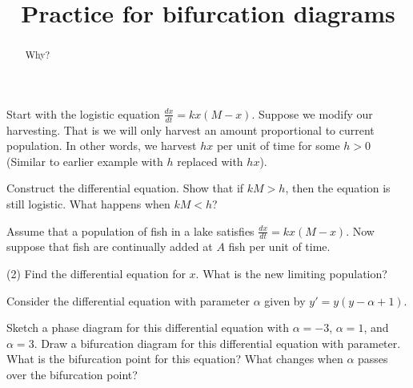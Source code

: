 \documentclass{ximera}
\title{Practice for bifurcation diagrams}
\begin{document}
\begin{abstract}
    Why?
\end{abstract}
\maketitle

\begin{exercise}
    Start with the logistic equation $\frac{dx}{dt} = kx(M-x)$. Suppose we modify our harvesting. That is we will only harvest  an amount proportional to current population. In other words, we harvest $hx$ per unit of time for some $h > 0$ (Similar to earlier example with $h$ replaced with $hx$).
    \begin{tasks}
        \task Construct the differential equation. 
        \task Show that if $kM > h$, then the equation is still logistic.
        \task What happens when $kM < h$?
    \end{tasks}
\end{exercise}


\begin{exercise}
    Assume that a population of fish in a lake satisfies $\frac{dx}{dt} = kx(M-x)$.  Now suppose that fish are continually added at $A$ fish per unit of time.
    \begin{tasks}(2)
        \task Find the differential equation for $x$.
        \task What is the new limiting population?
    \end{tasks}
\end{exercise}

\begin{exercise}
    Consider the differential equation with parameter $\alpha$ given by $y' = y(y - \alpha + 1)$. 
    \begin{tasks}
        \task Sketch a phase diagram for this differential equation with $\alpha = -3$, $\alpha = 1$, and $\alpha = 3$. 
        \task Draw a bifurcation diagram for this differential equation with parameter. 
        \task What is the bifurcation point for this equation? What changes when $\alpha$ passes over the bifurcation point?
    \end{tasks}
\end{exercise}
\end{document}
